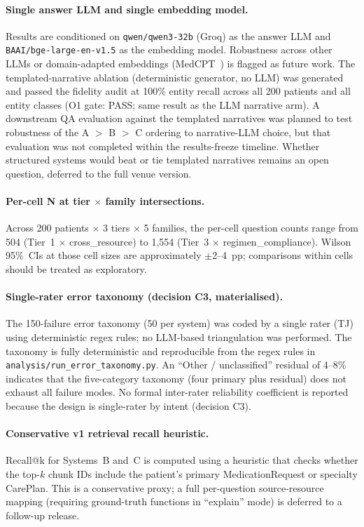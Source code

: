 \paragraph{Single answer LLM and single embedding model.}
Results are conditioned on \texttt{qwen/qwen3-32b} (Groq) as the answer LLM and
\texttt{BAAI/bge-large-en-v1.5} as the embedding model.  Robustness across other
LLMs or domain-adapted embeddings (MedCPT~\citep{jin2023medcpt}) is flagged as future
work.  The templated-narrative ablation (deterministic generator, no LLM) was generated and
passed the fidelity audit at 100\% entity recall across all 200 patients and all entity
classes (O1 gate: PASS; same result as the LLM narrative arm).  A downstream QA
evaluation against the templated narratives was planned to test robustness of the
A $>$ B $>$ C ordering to narrative-LLM choice, but that evaluation was not completed
within the results-freeze timeline.  Whether structured systems would beat or tie
templated narratives remains an open question, deferred to the full venue version.

\paragraph{Per-cell N at tier $\times$ family intersections.}
Across 200 patients $\times$ 3 tiers $\times$ 5 families, the per-cell question counts
range from 504 (Tier~1 $\times$ cross\_resource) to 1{,}554 (Tier~3 $\times$
regimen\_compliance).  Wilson 95\%~CIs at those cell sizes are approximately
$\pm$2--4~pp; comparisons within cells should be treated as exploratory.

\paragraph{Single-rater error taxonomy (decision C3, materialised).}
The 150-failure error taxonomy (50 per system) was coded by a single rater (TJ)
using deterministic regex rules; no LLM-based triangulation was performed. The taxonomy is fully deterministic and reproducible from the regex rules in \texttt{analysis/run\_error\_taxonomy.py}.  An ``Other / unclassified'' residual of 4--8\% indicates that the
five-category taxonomy (four primary plus residual) does not exhaust all failure modes.  No formal inter-rater
reliability coefficient is reported because the design is single-rater by intent
(decision C3).

\paragraph{Conservative v1 retrieval recall heuristic.}
Recall@k for Systems~B and~C is computed using a heuristic that checks whether the
top-$k$ chunk IDs include the patient's primary MedicationRequest or specialty CarePlan.
This is a conservative proxy; a full per-question source-resource mapping (requiring
ground-truth functions in ``explain'' mode) is deferred to a follow-up release.

